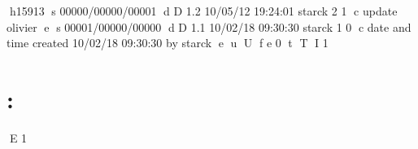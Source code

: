h15913
s 00000/00000/00001
d D 1.2 10/05/12 19:24:01 starck 2 1
c update olivier
e
s 00001/00000/00000
d D 1.1 10/02/18 09:30:30 starck 1 0
c date and time created 10/02/18 09:30:30 by starck
e
u
U
f e 0
t
T
I 1
\part{\projmrs: }
E 1
